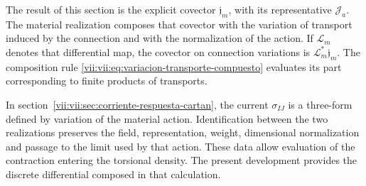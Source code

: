 The result of this section is the explicit covector
\(\mathfrak j_m\), with its representative \(\mathcal J_a\).
The material realization composes that covector with the variation of
transport induced by the connection and with the normalization of the action.
If \(\mathcal L_m\) denotes that differential map, the covector on
connection variations is \(\mathcal L_m^*\mathfrak j_m\).
The composition rule
\eqref{vii:vii:eq:variacion-transporte-compuesto} evaluates its part
corresponding to finite products of transports.

In section~\ref{vii:vii:sec:corriente-respuesta-cartan}, the current
\(\sigma_{IJ}\) is a three-form defined by variation of the material
action. Identification between the two realizations preserves the field,
representation, weight, dimensional normalization and passage to the
limit used by that action. These data allow evaluation of the
contraction entering the torsional density. The present
development provides the discrete differential composed in that calculation.
